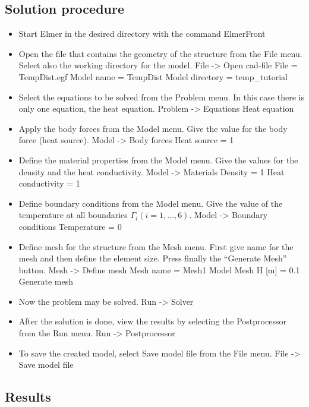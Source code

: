 \subsection*{Solution procedure}

\begin{itemize}
\item Start Elmer in the desired directory with the command 
\ttbegin
ElmerFront
\ttend
\item Open the file that contains the geometry of the structure from 
the File menu. Select also the working directory for the model.
\ttbegin
File -> Open cad-file 
  File = TempDist.egf 
  Model name = TempDist 
  Model directory = temp_tutorial
\ttend
\item Select the equations to be solved from the Problem menu. In this 
case there is only one equation, the heat equation. 
\ttbegin
Problem -> Equations 
  Heat equation 
\ttend
\item Apply the body forces from the Model menu. Give the value for the body 
force (heat source). 
\ttbegin
Model -> Body forces 
  Heat source = 1
\ttend
\item Define the material properties from the Model menu. Give the values for 
the density and the heat conductivity. 
\ttbegin
Model -> Materials 
  Density = 1 
  Heat conductivity = 1
\ttend
\item Define boundary conditions from the Model menu. Give the value of the 
temperature at all boundaries $\Gamma_i (i=1,\ldots,6)$.
\ttbegin
Model -> Boundary conditions 
  Temperature = 0 
\ttend
\item Define mesh for the structure from the Mesh menu. First give name for 
the mesh and then define the element size. Press finally the ``Generate 
Mesh'' button.
\ttbegin
Mesh -> Define mesh 
  Mesh name = Mesh1 
  Model Mesh H [m] = 0.1 
  Generate mesh
\ttend
\item Now the problem may be solved.
\ttbegin
Run -> Solver 
\ttend
\item After the solution is done, view the results by selecting the 
Postprocessor from the Run menu. 
\ttbegin
Run -> Postprocessor 
\ttend
\item To save the created model, select Save model file from the File menu.
\ttbegin
File -> Save model file 
\ttend
\end{itemize}

\subsection*{Results}

